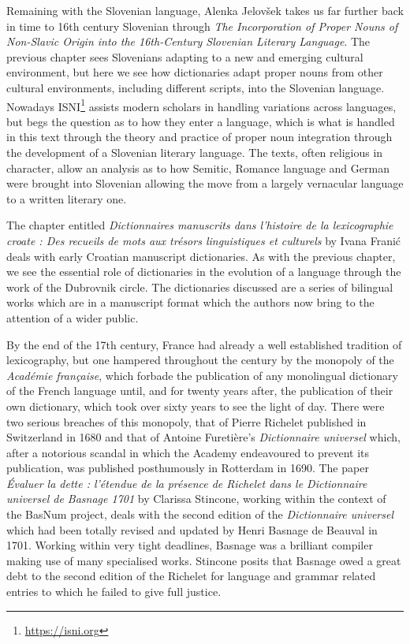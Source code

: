 \documentclass[output=paper]{langscibook}
\begin{document}
Remaining with the Slovenian language, Alenka Jelovšek takes us far further back in time to 16th century Slovenian through \textit{The Incorporation of Proper Nouns of Non-Slavic Origin into the 16th-Century Slovenian Literary Language}. The previous chapter sees Slovenians adapting to a new and emerging cultural environment, but here we see how dictionaries adapt proper nouns from other cultural environments, including different scripts, into the Slovenian language. Nowadays ISNI\footnote{\url{https://isni.org}} assists modern scholars in handling variations across languages, but begs the question as to how they enter a language, which is what is handled in this text through the theory and practice of proper noun integration through the development of a Slovenian literary language. The texts, often religious in character, allow an analysis as to how Semitic, Romance language and German were brought into Slovenian allowing the move from a largely vernacular language to a written literary one.

The chapter entitled \textit{Dictionnaires manuscrits dans l’histoire de la lexicographie croate : Des recueils de mots aux trésors linguistiques et culturels} by Ivana Franić deals with early Croatian manuscript dictionaries. As with the previous chapter, we see the essential role of dictionaries in the evolution of a language through the work of the Dubrovnik circle. The dictionaries discussed are a series of bilingual works which are in a manuscript format which the authors now bring to the attention of a wider public.

By the end of the 17th century, France had already a well established tradition of lexicography, but one hampered throughout the century by the monopoly of the \textit{Académie française}, which forbade the publication of any monolingual dictionary of the French language until, and for twenty years after, the publication of their own dictionary, which took over sixty years to see the light of day. There were two serious breaches of this monopoly, that of Pierre Richelet published in Switzerland in 1680 and that of Antoine Furetière's \textit{Dictionnaire universel} which, after a notorious scandal in which the Academy endeavoured to prevent its publication, was published posthumously in Rotterdam in 1690. The paper \textit{Évaluer la dette : l’étendue de la présence de Richelet dans le Dictionnaire universel de Basnage 1701} by Clarissa Stincone, working within the context of the BasNum project, deals with the second edition of the \textit{Dictionnaire universel} which had been totally revised and updated by Henri Basnage de Beauval in 1701. Working within very tight deadlines, Basnage was a brilliant compiler making use of many specialised works. Stincone posits that Basnage owed a great debt to the second edition of the Richelet for language and grammar related entries to which he failed to give full justice.
\end{document}
